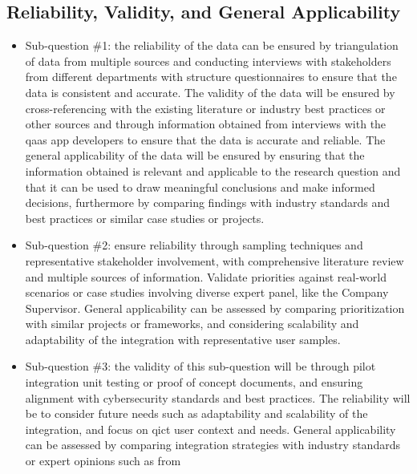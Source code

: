 \begin{multicols}{2}
      \subsection{Reliability, Validity, and General Applicability}
      \begin{itemize}[label=-]
            \item Sub-question \#1: the reliability of the data can be ensured by triangulation of data from
                  multiple sources and conducting interviews with stakeholders from different departments with
                  structure questionnaires to ensure that the data is consistent and accurate. The validity of
                  the data will be ensured by  cross-referencing with the existing literature or industry best
                  practices or other sources and  through information obtained from  interviews with the
                  \acrshort{qaas} app developers to ensure  that the data is accurate and reliable. The general
                  applicability of the data will be ensured by  ensuring that the information obtained is relevant
                  and applicable to the research question and  that it can be used to draw meaningful conclusions
                  and make informed decisions, furthermore by comparing findings with industry standards and best
                  practices or similar case studies or projects.
            \item Sub-question \#2: ensure reliability through sampling techniques and representative stakeholder
                  involvement, with comprehensive literature review and multiple sources of information. Validate
                  priorities against real-world scenarios or case studies involving diverse expert panel, like
                  the Company Supervisor. General applicability can be assessed by comparing prioritization with
                  similar projects or frameworks, and considering scalability and adaptability of the integration
                  with representative user samples.
            \item Sub-question \#3: the validity of this sub-question will be through pilot integration unit testing
                  or proof of concept documents, and ensuring alignment with cybersecurity standards and best
                  practices. The reliability will be to consider future needs such as adaptability and scalability of
                  the integration, and focus on \acrshort{qict} user context and needs. General applicability can be
                  assessed by comparing integration strategies with industry standards or expert opinions such as from

\end{itemize}
\end{multicols}

